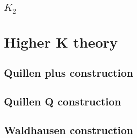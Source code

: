 \documentclass[12pt]{article}
\numberwithin{equation}{section}
\begin{document}
	\subsection{$K_2$}
	
	\section{Higher K theory}
	\subsection{Quillen plus construction}
	\subsection{Quillen Q construction}
	\subsection{Waldhausen construction}
	
\end{document}
